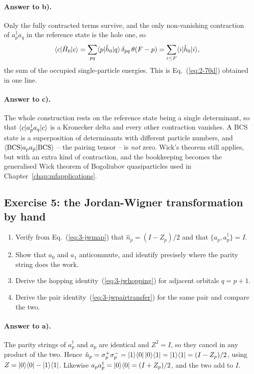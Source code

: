 \paragraph{Answer to b).}
Only the fully contracted terms survive, and the only non-vanishing
contraction of $a_p^{\dagger}a_q$ in the reference state is the hole one, so
\[
  \langle c | \hat{H}_0 | c \rangle
   = \sum_{pq}\langle p | \hat{h}_0 | q \rangle\,\delta_{pq}\,\theta(F-p)
   = \sum_{i\le F}\langle i | \hat{h}_0 | i \rangle ,
\]
the sum of the occupied single-particle energies.  This is
Eq.~(\ref{eq:2-70d}) obtained in one line.

\paragraph{Answer to c).}
The whole construction rests on the reference state being a single
determinant, so that $\langle c | a_p^{\dagger}a_q | c \rangle$ is a Kronecker delta
and every other contraction vanishes.  A BCS state is a superposition of
determinants with different particle numbers, and
$\langle \mathrm{BCS} | a_pa_{\bar p} | \mathrm{BCS} \rangle$ -- the pairing tensor --
is \emph{not} zero.  Wick's theorem still applies, but with an extra kind of
contraction, and the bookkeeping becomes the generalised Wick theorem of
Bogoliubov quasiparticles used in Chapter~\ref{chap:mfapplications}.

\subsection*{Exercise 5: the Jordan-Wigner transformation by hand}
\label{ex:3-jwbyhand}

\begin{enumerate}
  \item[a)] Verify from Eq.~(\ref{eq:3-jwmap}) that
  $\hat{n}_p=(I-Z_p)/2$ and that $\{a_p,a_p^{\dagger}\}=I$.
  \item[b)] Show that $a_0$ and $a_1$ anticommute, and identify precisely
  where the parity string does the work.
  \item[c)] Derive the hopping identity~(\ref{eq:3-jwhopping}) for adjacent
  orbitals $q=p+1$.
  \item[d)] Derive the pair identity~(\ref{eq:3-jwpairtransfer}) for the same
  pair and compare the two.
\end{enumerate}

\paragraph{Answer to a).}
The parity strings of $a_p^{\dagger}$ and $a_p$ are identical and
$Z^2=I$, so they cancel in any product of the two.  Hence
$\hat{n}_p=\sigma_p^{+}\sigma_p^{-}=\vert 1 \rangle\langle 0 \vert\,\vert 0 \rangle\langle 1 \vert
=\vert 1 \rangle\langle 1 \vert=(I-Z_p)/2$, using $Z=\vert 0 \rangle\langle 0 \vert-\vert 1 \rangle\langle 1 \vert$.  Likewise
$a_pa_p^{\dagger}=\vert 0 \rangle\langle 0 \vert=(I+Z_p)/2$, and the two add to $I$.

